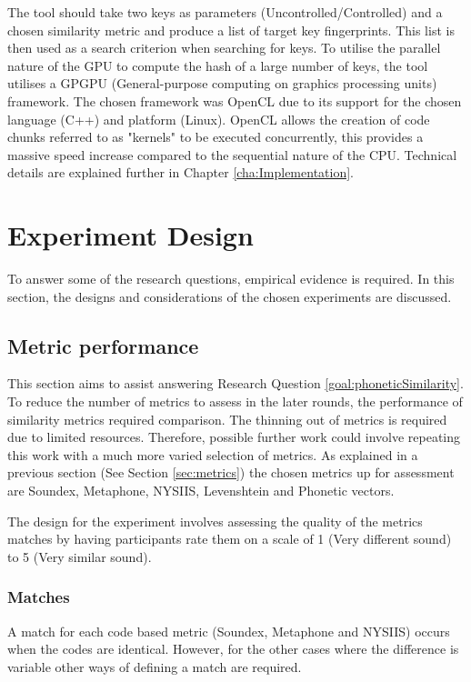 The tool should take two keys as parameters (Uncontrolled/Controlled) and a chosen similarity metric and produce a list of target key fingerprints. This list is then used as a search criterion when searching for keys. To utilise the parallel nature of the GPU to compute the hash of a large number of keys, the tool utilises a GPGPU (General-purpose computing on graphics processing units) framework. The chosen framework was OpenCL due to its support for the chosen language (C++) and platform (Linux). OpenCL allows the creation of code chunks referred to as "kernels" to be executed concurrently, this provides a massive speed increase compared to the sequential nature of the CPU. Technical details are explained further in Chapter \ref{cha:Implementation}.

\section{Experiment Design}
To answer some of the research questions, empirical evidence is required. In this section, the designs and considerations of the chosen experiments are discussed.

\subsection{Metric performance}
\label{exp:metric}
This section aims to assist answering Research Question \ref{goal:phoneticSimilarity}. To reduce the number of metrics to assess in the later rounds, the performance of similarity metrics required comparison. The thinning out of metrics is required due to limited resources. Therefore, possible further work could involve repeating this work with a much more varied selection of metrics. As explained in a previous section (See Section \ref{sec:metrics}) the chosen metrics up for assessment are Soundex, Metaphone, NYSIIS, Levenshtein and Phonetic vectors.

The design for the experiment involves assessing the quality of the metrics matches by having participants rate them on a scale of 1 (Very different sound) to 5 (Very similar sound).

\subsubsection{Matches}
\label{sec:matches}

A match for each code based metric (Soundex, Metaphone and NYSIIS) occurs when the codes are identical. However, for the other cases where the difference is variable other ways of defining a match are required.

